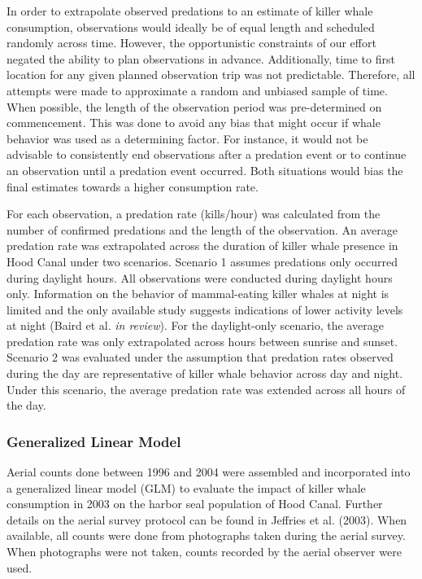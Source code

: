 In order to extrapolate observed predations to an estimate of killer
whale consumption, observations would ideally be of equal length and
scheduled randomly across time. However, the opportunistic constraints
of our effort negated the ability to plan observations in advance.
Additionally, time to first location for any given planned observation
trip was not predictable. Therefore, all attempts were made to
approximate a random and unbiased sample of time. When possible, the
length of the observation period was pre-determined on commencement.
This was done to avoid any bias that might occur if whale behavior was
used as a determining factor. For instance, it would not be advisable to
consistently end observations after a predation event or to continue an
observation until a predation event occurred. Both situations would bias
the final estimates towards a higher consumption rate.

For each observation, a predation rate (kills/hour) was calculated from
the number of confirmed predations and the length of the observation. An
average predation rate was extrapolated across the duration of killer
whale presence in Hood Canal under two scenarios. Scenario 1 assumes
predations only occurred during daylight hours. All observations were
conducted during daylight hours only. Information on the behavior of
mammal-eating killer whales at night is limited and the only available
study suggests indications of lower activity levels at night (Baird et
al. \emph{in review}). For the daylight-only scenario, the average
predation rate was only extrapolated across hours between sunrise and
sunset. Scenario 2 was evaluated under the assumption that predation
rates observed during the day are representative of killer whale
behavior across day and night. Under this scenario, the average
predation rate was extended across all hours of the day.

\subsubsection{Generalized Linear Model}\label{generalized-linear-model}

Aerial counts done between 1996 and 2004 were assembled and incorporated
into a generalized linear model (GLM) to evaluate the impact of killer
whale consumption in 2003 on the harbor seal population of Hood Canal.
Further details on the aerial survey protocol can be found in Jeffries
et al. (2003). When available, all counts were done from photographs
taken during the aerial survey. When photographs were not taken, counts
recorded by the aerial observer were used.

